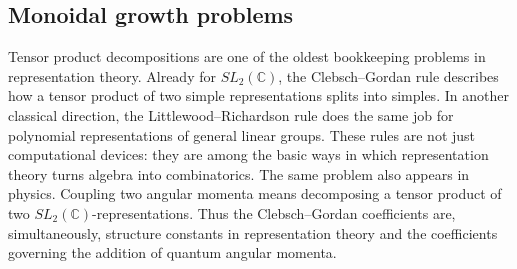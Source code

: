 \documentclass[a4paper,11pt]{amsart}
\newcommand{\C}{\mathbb{C}}
\numberwithin{equation}{subsection}
\theoremstyle{definition}
\theoremstyle{remark}
\begin{document}
\subsection{Monoidal growth problems}\label{sec:gengrowth}

Tensor product decompositions are one of the oldest bookkeeping problems in
representation theory. Already for \(SL_2(\C)\), the
Clebsch--Gordan rule describes how a tensor product of two simple
representations splits into simples. In another classical direction,
the Littlewood--Richardson rule does the same job for polynomial
representations of general linear groups. These rules are not just
computational devices: they are among the basic ways in which representation
theory turns algebra into combinatorics.
The same problem also appears in physics. Coupling two angular momenta means
decomposing a tensor product of two \(SL_2(\C)\)-representations.
Thus the Clebsch--Gordan coefficients are, simultaneously, structure
constants in representation theory and the coefficients governing the
addition of quantum angular momenta.
\end{document}
